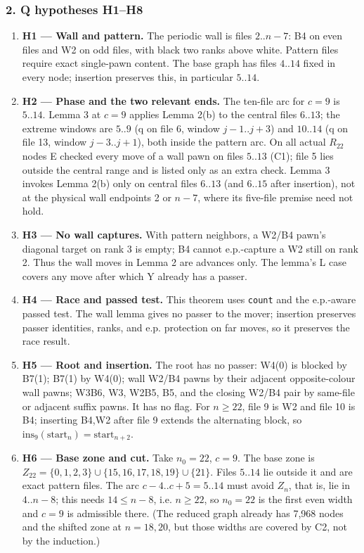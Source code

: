 \subsubsection*{2. Q hypotheses H1–H8}
\begin{enumerate}
\item \textbf{H1 — Wall and pattern.} The periodic wall is files $2..n-7$: B4 on even files and W2 on odd files, with black two ranks above white. Pattern files require exact single-pawn content. The base graph has files $4..14$ fixed in every node; insertion preserves this, in particular $5..14$.
\item \textbf{H2 — Phase and the two relevant ends.} The ten-file arc for $c=9$ is $5..14$. Lemma 3 at $c=9$ applies Lemma 2(b) to the central files $6..13$; the extreme windows are $5..9$ (q on file 6, window $j-1..j+3$) and $10..14$ (q on file 13, window $j-3..j+1$), both inside the pattern arc. On all actual $R_{22}$ nodes E checked every move of a wall pawn on files $5..13$ (C1); file 5 lies outside the central range and is listed only as an extra check. Lemma 3 invokes Lemma 2(b) only on central files $6..13$ (and $6..15$ after insertion), not at the physical wall endpoints 2 or $n-7$, where its five-file premise need not hold.
\item \textbf{H3 — No wall captures.} With pattern neighbors, a W2/B4 pawn's diagonal target on rank 3 is empty; B4 cannot e.p.-capture a W2 still on rank 2. Thus the wall moves in Lemma 2 are advances only. The lemma's L case covers any move after which Y already has a passer.
\item \textbf{H4 — Race and passed test.} This theorem uses \texttt{count} and the e.p.-aware passed test. The wall lemma gives no passer to the mover; insertion preserves passer identities, ranks, and e.p. protection on far moves, so it preserves the race result.
\item \textbf{H5 — Root and insertion.} The root has no passer: W4(0) is blocked by B7(1); B7(1) by W4(0); wall W2/B4 pawns by their adjacent opposite-colour wall pawns; W3B6, W3, W2B5, B5, and the closing W2/B4 pair by same-file or adjacent suffix pawns. It has no flag. For $n\ge22$, file 9 is W2 and file 10 is B4; inserting B4,W2 after file 9 extends the alternating block, so $\mathrm{ins}_9(\mathrm{start}_n)=\mathrm{start}_{n+2}$.
\item \textbf{H6 — Base zone and cut.} Take $n_0=22$, $c=9$. The base zone is $Z_{22}=\{0,1,2,3\}\cup\{15,16,17,18,19\}\cup\{21\}$. Files $5..14$ lie outside it and are exact pattern files. The arc $c-4..c+5=5..14$ must avoid $Z_n$, that is, lie in $4..n-8$; this needs $14\le n-8$, i.e. $n\ge22$, so $n_0=22$ is the first even width and $c=9$ is admissible there. (The reduced graph already has 7,968 nodes and the shifted zone at $n=18,20$, but those widths are covered by C2, not by the induction.)

\end{enumerate}
